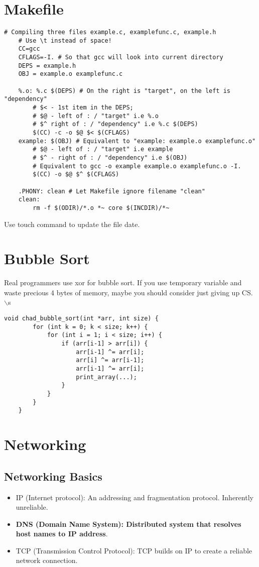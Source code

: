 \documentclass{article}
\begin{document}
\section{Makefile}
\begin{lstlisting}[style=BashStyle]
    # Compiling three files example.c, examplefunc.c, example.h
    # Use \t instead of space!
    CC=gcc
    CFLAGS=-I. # So that gcc will look into current directory
    DEPS = example.h
    OBJ = example.o examplefunc.c

    %.o: %.c $(DEPS) # On the right is "target", on the left is "dependency"
        # $< - 1st item in the DEPS;
        # $@ - left of : / "target" i.e %.o
        # $^ right of : / "dependency" i.e %.c $(DEPS)
        $(CC) -c -o $@ $< $(CFLAGS)
    example: $(OBJ) # Equivalent to "example: example.o examplefunc.o"
        # $@ - left of : / "target" i.e example
        # $^ - right of : / "dependency" i.e $(OBJ)
        # Equivalent to gcc -o example example.o examplefunc.o -I.
        $(CC) -o $@ $^ $(CFLAGS) 
    
    .PHONY: clean # Let Makefile ignore filename "clean"
    clean:
        rm -f $(ODIR)/*.o *~ core $(INCDIR)/*~
\end{lstlisting}
Use touch command to update the file date.

\section{Bubble Sort}
Real programmers use xor for bubble sort. If you use temporary variable and waste precious 4 bytes of memory, maybe you should consider just giving up CS. $\backslash$s
\begin{lstlisting}[style=CStyle]
    void chad_bubble_sort(int *arr, int size) {
        for (int k = 0; k < size; k++) {
            for (int i = 1; i < size; i++) {
                if (arr[i-1] > arr[i]) {
                    arr[i-1] ^= arr[i];
                    arr[i] ^= arr[i-1];
                    arr[i-1] ^= arr[i];
                    print_array(...);
                }
            }
        }
    }
\end{lstlisting}

\section{Networking}

\subsection{Networking Basics}
\begin{itemize}
    \item IP (Internet protocol): An addressing and fragmentation protocol. Inherently unreliable.
    \item \textbf{DNS (Domain Name System): Distributed system that resolves host names to IP address}.
    \item TCP (Transmission Control Protocol): TCP builds on IP to create a reliable network connection.
\end{itemize}
\end{document}
